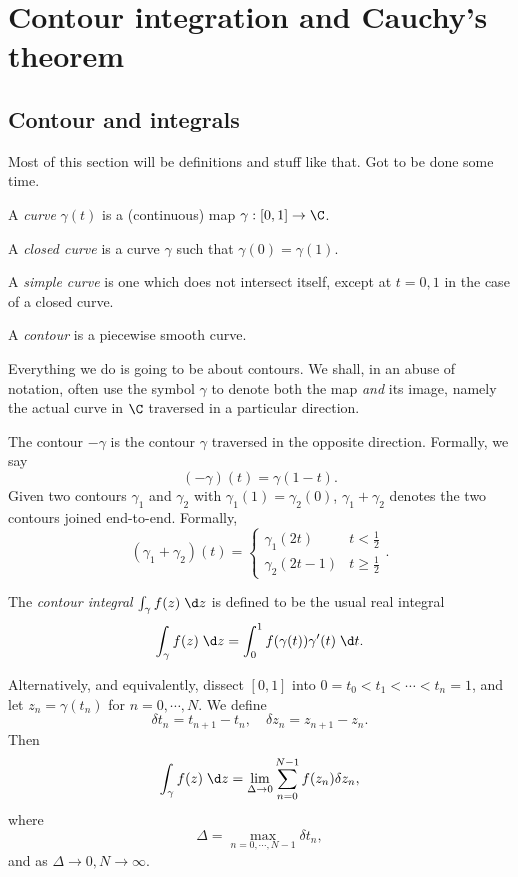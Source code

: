 \documentclass[a4paper]{article}
\begin{document}
\section{Contour integration and Cauchy's theorem}
\subsection{Contour and integrals}
Most of this section will be definitions and stuff like that. Got to be done some time.

\begin{defi}[Curve]
  A \emph{curve} $\gamma(t)$ is a (continuous) map $\gamma: [0, 1] \to \C$.
\end{defi}

\begin{defi}
  A \emph{closed curve} is a curve $\gamma$ such that $\gamma(0) = \gamma(1)$.
\end{defi}

\begin{defi}
  A \emph{simple curve} is one which does not intersect itself, except at $t = 0, 1$ in the case of a closed curve.
\end{defi}

\begin{defi}[Contour]
  A \emph{contour} is a piecewise smooth curve.
\end{defi}
Everything we do is going to be about contours. We shall, in an abuse of notation, often use the symbol $\gamma$ to denote both the map \emph{and} its image, namely the actual curve in $\C$ traversed in a particular direction.

\begin{notation}
  The contour $-\gamma$ is the contour $\gamma$ traversed in the opposite direction. Formally, we say
  \[
    (-\gamma)(t) = \gamma(1 - t).
  \]
  Given two contours $\gamma_1$ and $\gamma_2$ with $\gamma_1(1) = \gamma_2(0)$, $\gamma_1 + \gamma_2$ denotes the two contours joined end-to-end. Formally,
  \[
    (\gamma_1 + \gamma_2)(t) =
    \begin{cases}
      \gamma_1(2t) & t < \frac{1}{2}\\
      \gamma_2(2t - 1) & t \geq \frac{1}{2}
    \end{cases}.
  \]
\end{notation}

\begin{defi}
  The \emph{contour integral} $\int_\gamma f(z)\;\d z$ is defined to be the usual real integral
  \[
    \int_\gamma f(z)\;\d z= \int_0^1 f(\gamma(t)) \gamma'(t)\;\d t.
  \]
\end{defi}
Alternatively, and equivalently, dissect $[0, 1]$ into $0 = t_0 < t_1 < \cdots < t_n = 1$, and let $z_n = \gamma(t_n)$ for $n = 0, \cdots, N$. We define
\[
  \delta t_n = t_{n + 1} - t_n,\quad \delta z_n = z_{n + 1} - z_n.
\]
Then
\[
  \int_\gamma f(z)\;\d z = \lim_{\Delta \to 0} \sum_{n = 0}^{N - 1} f(z_n) \delta z_n,
\]
where
\[
  \Delta = \max_{n = 0, \cdots, N - 1} \delta t_n,
\]
and as $\Delta \to 0, N \to \infty$.
\end{document}
